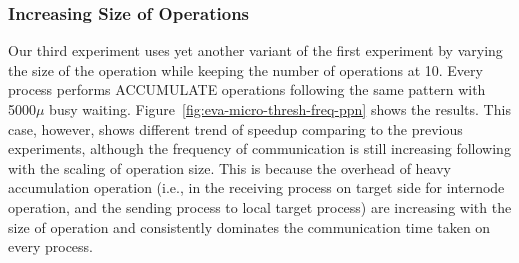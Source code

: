 \subsubsection{Increasing Size of Operations}
Our third experiment uses yet another variant of the first experiment
by varying the size of the operation while keeping the number of
operations at 10. Every process performs ACCUMULATE operations
following the same pattern with 5000$\mu$ busy waiting.
Figure~\ref{fig:eva-micro-thresh-freq-ppn} shows the results.
This case, however, shows different trend of speedup comparing to the
previous experiments, although the frequency of communication is still
increasing following with the scaling of operation size. This is because
the overhead of heavy accumulation operation (i.e., in the receiving
process on target side for internode operation, and the sending process
to local target process) are increasing with the size of operation and
consistently dominates the communication time taken on every process.

